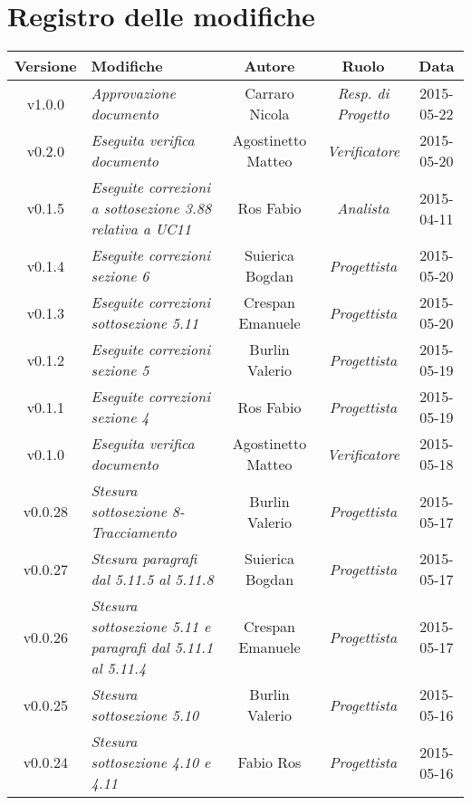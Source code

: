 \newpage
\section*{Registro delle modifiche}

\begin{table}[h]
\centering
\begin{tabular}{|c|p{}|c|c|c|}
	\toprule
		\textbf{Versione} & \textbf{Modifiche} & \textbf{Autore} & \textbf{Ruolo} & \textbf{Data} \\
	\midrule
		v1.0.0 & \textit{Approvazione documento} & Carraro Nicola & \textit{Resp. di Progetto} & 2015-05-22\\
	\midrule
		v0.2.0 & \textit{Eseguita verifica documento} & Agostinetto Matteo & \textit{Verificatore} & 2015-05-20\\
	\midrule
		v0.1.5 & \textit{Eseguite correzioni a sottosezione 3.88 relativa a UC11} & Ros Fabio & \textit{Analista} & 2015-04-11\\
	\midrule
		v0.1.4 & \textit{Eseguite correzioni sezione 6} & Suierica Bogdan & \textit{Progettista} & 2015-05-20\\
	\midrule
		v0.1.3 & \textit{Eseguite correzioni sottosezione 5.11} & Crespan Emanuele & \textit{Progettista} & 2015-05-20\\
	\midrule
		v0.1.2 & \textit{Eseguite correzioni sezione 5} & Burlin Valerio & \textit{Progettista} & 2015-05-19\\
	\midrule
		v0.1.1 & \textit{Eseguite correzioni sezione 4} & Ros Fabio & \textit{Progettista} & 2015-05-19\\
	\midrule
		v0.1.0 & \textit{Eseguita verifica documento} & Agostinetto Matteo & \textit{Verificatore} & 2015-05-18\\
	\midrule
		v0.0.28 & \textit{Stesura sottosezione 8-Tracciamento} & Burlin Valerio & \textit{Progettista} & 2015-05-17\\
	\midrule
		v0.0.27 & \textit{Stesura paragrafi dal 5.11.5 al 5.11.8} & Suierica Bogdan & \textit{Progettista} & 2015-05-17\\
	\midrule
		v0.0.26 & \textit{Stesura sottosezione 5.11 e paragrafi dal 5.11.1 al 5.11.4} & Crespan Emanuele & \textit{Progettista} & 2015-05-17\\
	\midrule
		v0.0.25 & \textit{Stesura sottosezione 5.10} & Burlin Valerio & \textit{Progettista} & 2015-05-16\\
	\midrule
		v0.0.24 & \textit{Stesura sottosezione 4.10 e 4.11} & Fabio Ros & \textit{Progettista} & 2015-05-16\\

\end{tabular}
\end{table}
